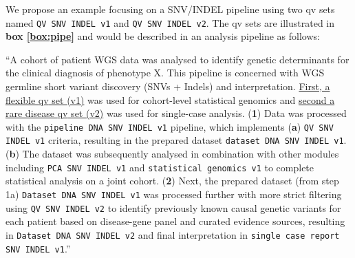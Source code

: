 We propose an example focusing on a SNV/INDEL pipeline using two \ac{qv} sets named 
\colorbox{colorSUNSET2!60}{\texttt{QV SNV INDEL v1}} and
\colorbox{colorSUNSET2!60}{\texttt{QV SNV INDEL v2}}.
The \ac{qv} sets are illustrated in 
\textbf{box \ref{box:pipe}}
and would be described in an analysis pipeline as follows:

``A cohort of patient WGS data was analysed to identify genetic determinants for the clinical diagnosis of phenotype X. 
This pipeline is concerned with WGS germline short variant discovery (SNVs + Indels) and interpretation.
\underline{First, a flexible \ac{qv} set (v1)} was used for cohort-level statistical genomics and \underline{second a rare disease \ac{qv} set (v2)} was used for single-case analysis.
(\textbf{1}) Data was processed with the 
\colorbox{colorSUNSET1!30}{\texttt{pipeline DNA SNV INDEL v1}} pipeline, which implements
(\textbf{a}) \colorbox{colorSUNSET2!60}{\texttt{QV SNV INDEL v1}} criteria, resulting in the prepared dataset
\colorbox{colorSUNSET3!30}{\texttt{dataset DNA SNV INDEL v1}}.
(\textbf{b}) The dataset was subsequently analysed in combination with other modules including 
\colorbox{colorSUNSET4!30}{\texttt{PCA SNV INDEL v1}} and 
\colorbox{colorSUNSET5!30}{\texttt{statistical genomics v1}} to complete statistical analysis on a joint cohort.
(\textbf{2}) Next, 
 the prepared dataset (from step 1a)
\colorbox{colorSUNSET3!30}{\texttt{Dataset DNA SNV INDEL v1}} was processed further with more strict filtering using
\colorbox{colorSUNSET2!60}{\texttt{QV SNV INDEL v2}} to identify previously known causal genetic variants for each patient based on disease-gene panel and curated evidence sources, resulting in \colorbox{colorSUNSET3!30}{\texttt{Dataset DNA SNV INDEL v2}} and final interpretation in
\colorbox{colorSUNSET5!30}{\texttt{single case report SNV INDEL v1}}.''

